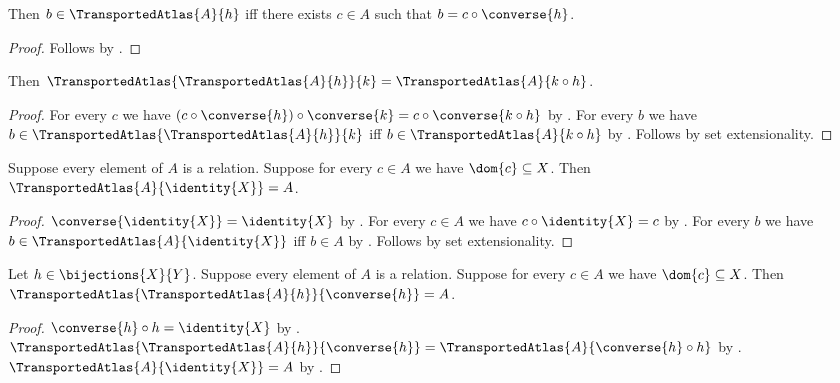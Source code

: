 \begin{theorem}\label{transported_atlas_iff}
    Then $b\in\TransportedAtlas{A}{h}$ iff
        there exists $c\in A$ such that $b=c\circ\converse{h}$.
\end{theorem}
\begin{proof}
    Follows by .
\end{proof}

\begin{theorem}\label{transported_atlas_composition}
    Then $\TransportedAtlas{\TransportedAtlas{A}{h}}{k}=\TransportedAtlas{A}{k\circ h}$.
\end{theorem}
\begin{proof}
    For every $c$ we have $(c\circ\converse{h})\circ\converse{k}
        =c\circ\converse{k\circ h}$ by .
    For every $b$ we have $b\in\TransportedAtlas{\TransportedAtlas{A}{h}}{k}$ iff
        $b\in\TransportedAtlas{A}{k\circ h}$ by .
    Follows by set extensionality.
\end{proof}

\begin{theorem}\label{transported_atlas_identity}
    Suppose every element of $A$ is a relation.
    Suppose for every $c\in A$ we have $\dom{c}\subseteq X$.
    Then $\TransportedAtlas{A}{\identity{X}}=A$.
\end{theorem}
\begin{proof}
    $\converse{\identity{X}}=\identity{X}$ by .
    For every $c\in A$ we have $c\circ\identity{X}=c$ by .
    For every $b$ we have $b\in\TransportedAtlas{A}{\identity{X}}$ iff $b\in A$ by
        .
    Follows by set extensionality.
\end{proof}

\begin{theorem}\label{transported_atlas_roundtrip}
    Let $h\in\bijections{X}{Y}$.
    Suppose every element of $A$ is a relation.
    Suppose for every $c\in A$ we have $\dom{c}\subseteq X$.
    Then $\TransportedAtlas{\TransportedAtlas{A}{h}}{\converse{h}}=A$.
\end{theorem}
\begin{proof}
    $\converse{h}\circ h=\identity{X}$ by .
    $\TransportedAtlas{\TransportedAtlas{A}{h}}{\converse{h}}
        =\TransportedAtlas{A}{\converse{h}\circ h}$ by .
    $\TransportedAtlas{A}{\identity{X}}=A$ by .
\end{proof}

